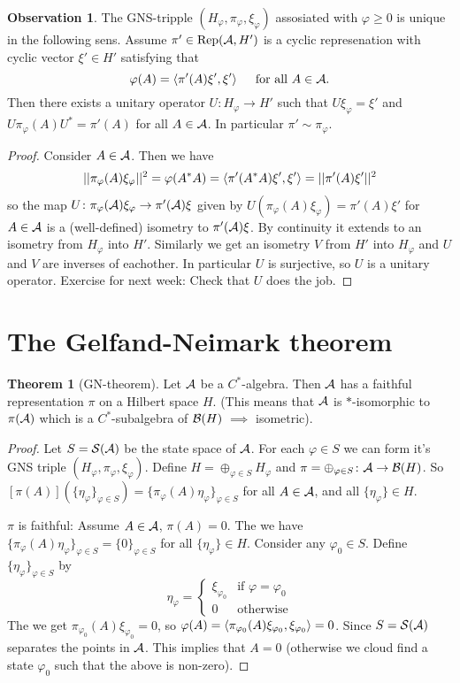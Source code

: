 \documentclass[10pt,english,a4paper]{article}
\theoremstyle{definition}
\newtheorem*{theorem}{Theorem}
\newtheorem*{observation}{Observation}
\def\pivp{\pi_{\vphi}}
\def\Hvp{H_{\vphi}}
\def\xivp{\xi_{\vphi}}
\def\etavp{\eta_{\vphi}}
\DeclareMathOperator{\Rep}{Rep}
\def\vphi{\varphi}
\begin{document}
\begin{observation}
    The GNS-tripple $(H_{\vphi}, \pi_{\vphi}, \xi_{\vphi})$ assosiated with 
$\vphi \geq 0$ is unique in the following sens. Assume $\pi' \in \Rep(\As,H')$ is 
a cyclic represenation with cyclic vector $\xi' \in H'$ satisfying that
\[ \vphi(A) = \ind{\pi'(A)\xi',\xi'} \quad \text{ for all } A \in \As.\]
Then there exists a unitary operator $U \colon H_{\vphi}\to H'$ such that  
$U\xi_{\vphi} = \xi'$ and $U\pi_{\vphi}(A)U^* = \pi'(A)$ for all $A \in \mathcal{A}$.
In particular $\pi' \sim \pi_{\vphi}$.
\end{observation}
\begin{proof}
Consider $A \in \mathcal{A}$. Then we have 
\begin{align*}
||\pi_{\vphi}(A)\xi_{\vphi}||^2 = \vphi(A^*A) = \ind{\pi'(A^*A)\xi',\xi'} 
= ||\pi'(A)\xi'||^2  
\end{align*}
so the map
$U\colon \pi_{\vphi}(\As)\xi_{\vphi} \to\pi'(\As)\xi$ given by 
$U(\pi_{\vphi}(A)\xi_{\vphi}) = \pi'(A)\xi'$ for $A \in \mathcal{A}$ is a (well-defined)
isometry to $\pi'(\mathcal{A})\xi$. By continuity it extends to an isometry from $H_{\vphi}$
into $H'$. Similarly we get an isometry $V$ from $H'$ into $H_{\vphi}$ and $U$
and $V$ are inverses of eachother. In particular $U$ is surjective, so $U$
is a unitary operator. Exercise for next week: Check that $U$ does the job. 

\end{proof}

\section*{The Gelfand-Neimark theorem}

\begin{theorem}[GN-theorem]
    Let $\mathcal{A}$ be a $C^*$-algebra. Then $\mathcal{A}$ has a faithful
representation $\pi$ on a Hilbert space $H$. 
(This means that $\mathcal{A}$ is $*$-isomorphic to $\pi(\mathcal{A})$ which is a 
$C^*$-subalgebra of $\mathcal{B}(H)$ $\implies$ isometric).
\end{theorem}
\begin{proof}
    Let $S = \mathcal{S}(\mathcal{A})$ be the state space of $\mathcal{A}$. For each $\vphi \in S$ 
we can form it's GNS triple $(\Hvp, \pivp, \xivp)$. 
Define $H = \oplus_{\vphi \in S} \Hvp$ and $\pi = \oplus_{\vphi \in S}\colon
\As\to \Bs(H)$. So $[\pi(A)](\{\etavp\}_{\vphi\in S}) = \{ \pivp(A)\etavp\}_{\vphi \in S}$
for all $A \in \mathcal{A}$, and all $\{\etavp\} \in H$.

$\pi$ is faithful: Assume $A\in \mathcal{A}$, $\pi(A) =0$. The we have 
$\{ \pivp(A)\etavp \}_{\vphi\in S} = \{0\}_{\vphi \in S}$ for all $\{\etavp\}
\in H$. Consider any $\vphi_0 \in S$. Define $\{\etavp\}_{\vphi \in S}$ by
\[ \etavp = \begin{cases} \xi_{\vphi_0} & \text{if } \vphi = \vphi_0 \\
0 & \text{otherwise} \end{cases} \]
The we get $\pi_{\vphi_0}(A) \xi_{\vphi_0} = 0$, so $\vphi(A) = \ind{\pi_{\vphi_0}(A)\xi_{\vphi_0}, \xi_{\vphi_0}}= 0$.
Since $S = \mathcal{S}(\mathcal{A})$ separates the points in $\mathcal{A}$. This implies that $A=0$ 
(otherwise we cloud find a state $\vphi_0$ such that the above is non-zero).
\end{proof}
\end{document}
